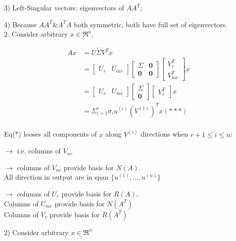 3) Left-Singular vectors: eigenvectors of $AA^T$;

4) Because $AA^T \& A^TA$ both symmetric, both have full set of eigenvectors.\\

2. Consider arbitrary $x\in \Re^n$, 

\begin{align*}
Ax &= U\tilde{\Sigma} V^Tx\\
&= 
\begin{bmatrix}%
U_r & U_{mr}
\end{bmatrix}
\begin{bmatrix}%
\Sigma & \textbf{0}\\
\textbf{0}& \textbf{0}
\end{bmatrix}
\begin{bmatrix}%
V_r^T\\
V_{mr}^T
\end{bmatrix}x\\
&= 
\begin{bmatrix}%
U_r & U_{mr}
\end{bmatrix}
\begin{bmatrix}%
\Sigma\\
\textbf{0}
\end{bmatrix}
\begin{bmatrix}%
V_r^T
\end{bmatrix}x\\
&= \Sigma^r_{i=1}\sigma_iu^{(i)}(V^{(1)})^Tx (***)
\end{align*}
\\

Eq(*) looses all components of $x$ along $V^{(i)}$ directions when $r+1 \leq i \leq n$:

$\rightarrow$ i.e. columns of $V_{nr}$

$\rightarrow$ columns of $V_{nr}$ provide basis for $N(A)$.\\


All direction in output are in span $\{u^{(1)} ,..., u^{(n)}\}$

$\rightarrow$ columns of $U_r$ provide basis for $R(A)$.\\

Columns of $U_{mr}$ provide basis for $N(A^T)$\\

Columns of $V_{r}$ provide basis for $R(A^T)$


2) Consider arbitrary $x\in \Re^n$

